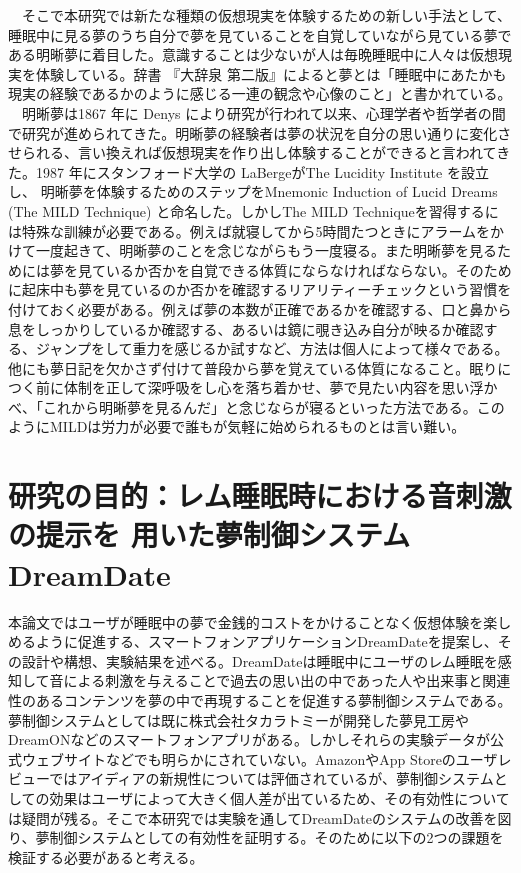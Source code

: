 　そこで本研究では新たな種類の仮想現実を体験するための新しい手法として、睡眠中に見る夢のうち自分で夢を見ていることを自覚していながら見ている夢である明晰夢に着目した。意識することは少ないが人は毎晩睡眠中に人々は仮想現実を体験している。辞書 『大辞泉 第二版』によると夢とは「睡眠中にあたかも現実の経験であるかのように感じる一連の観念や心像のこと」\cite{dream}と書かれている。\\
　明晰夢は1867 年に Denys により研究が行われて以来\cite{saintDenys}、心理学者や哲学者の間で研究が進められてきた。明晰夢の経験者は夢の状況を自分の思い通りに変化させられる、言い換えれば仮想現実を作り出し体験することができると言われてきた。1987 年にスタンフォード大学の LaBergeがThe Lucidity Institute を設立し、 明晰夢を体験するためのステップをMnemonic Induction of Lucid Dreams (The MILD Technique) と命名した\cite{LaBerge}。しかしThe MILD Techniqueを習得するには特殊な訓練が必要である。例えば就寝してから5時間たつときにアラームをかけて一度起きて、明晰夢のことを念じながらもう一度寝る。また明晰夢を見るためには夢を見ているか否かを自覚できる体質にならなければならない。そのために起床中も夢を見ているのか否かを確認するリアリティーチェックという習慣を付けておく必要がある。例えば夢の本数が正確であるかを確認する、口と鼻から息をしっかりしているか確認する、あるいは鏡に覗き込み自分が映るか確認する、ジャンプをして重力を感じるか試すなど、方法は個人によって様々である。他にも夢日記を欠かさず付けて普段から夢を覚えている体質になること。眠りにつく前に体制を正して深呼吸をし心を落ち着かせ、夢で見たい内容を思い浮かべ、「これから明晰夢を見るんだ」と念じならが寝るといった方法である。このようにMILDは労力が必要で誰もが気軽に始められるものとは言い難い。

\section{研究の目的：レム睡眠時における音刺激の提示を 用いた夢制御システムDreamDate}
本論文ではユーザが睡眠中の夢で金銭的コストをかけることなく仮想体験を楽しめるように促進する、スマートフォンアプリケーションDreamDateを提案し、その設計や構想、実験結果を述べる。DreamDateは睡眠中にユーザのレム睡眠を感知して音による刺激を与えることで過去の思い出の中であった人や出来事と関連性のあるコンテンツを夢の中で再現することを促進する夢制御システムである。夢制御システムとしては既に株式会社タカラトミーが開発した夢見工房\cite{takaratomi}やDreamON\cite{dreamOn}などのスマートフォンアプリがある。しかしそれらの実験データが公式ウェブサイトなどでも明らかにされていない。AmazonやApp Storeのユーザレビューではアイディアの新規性については評価されているが、夢制御システムとしての効果はユーザによって大きく個人差が出ているため、その有効性については疑問が残る。そこで本研究では実験を通してDreamDateのシステムの改善を図り、夢制御システムとしての有効性を証明する。そのために以下の2つの課題を検証する必要があると考える。

